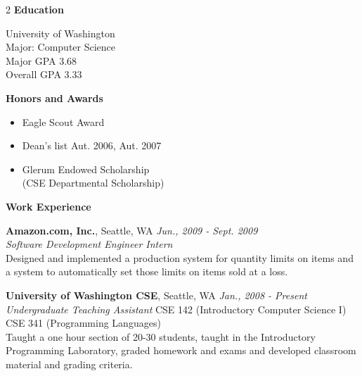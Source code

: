 \documentclass[9pt]{article}
\newcommand{\mysectiontitle}[1]{ { { \large{\textbf{#1} } } \vspace{0.02in}} }
\newcommand{\smallvspace}{\vspace{0.1cm}}
\newenvironment{changemargin}[2]{%
  \begin{list}{}{%
    \setlength{\topsep}{0pt}%
    \setlength{\leftmargin}{#1}%
    \setlength{\rightmargin}{#2}%
    \setlength{\listparindent}{\parindent}%
    \setlength{\itemindent}{\parindent}%
    \setlength{\parsep}{\parskip}%
  }%
  \item[]}{\end{list}}
\begin{document}
  \begin{changemargin}{1cm}{0.5cm}
    \begin{multicols}{2}
      \mysectiontitle{Education}
      \vspace{-0.5em}
      \begin{changemargin}{0.5cm}{0.5cm}
      University of Washington \\
      Major: Computer Science \\
      Major GPA   3.68 \\
      Overall GPA 3.33 \\
      \end{changemargin}
      \vspace{1em}
    
      \mysectiontitle{Honors and Awards}
      \vspace{-0.5em}
      \begin{itemize}
        \itemsep -1px
        \item Eagle Scout Award
        \item Dean's list Aut. 2006, Aut. 2007
        \item Glerum Endowed Scholarship \\ (CSE Departmental Scholarship)
      \end{itemize}
    \end{multicols}

    \vspace{-0.5em}\smallvspace
    \mysectiontitle{Work Experience}
    \begin{changemargin}{0.5cm}{0.5cm}
      {\textbf{Amazon.com, Inc.}}, Seattle, WA \hfill \textit{Jun., 2009 - Sept. 2009} \\
      \textit{Software Development Engineer Intern} \\
      Designed and implemented a production system for quantity limits on items
      and a system to automatically set those limits on items sold at a loss.
    
      \smallvspace
      {\textbf{University of Washington CSE}}, Seattle, WA \hfill \textit{Jan., 2008 - Present} \\
      \textit {Undergraduate Teaching Assistant}           CSE 142 (Introductory Computer Science I)
       CSE 341 (Programming Languages)           \\
      Taught a one hour section of 20-30 students, taught in the Introductory Programming 
      Laboratory, graded homework and exams and developed  classroom material and grading criteria.
  

\end{changemargin}
\end{changemargin}
\end{document}
